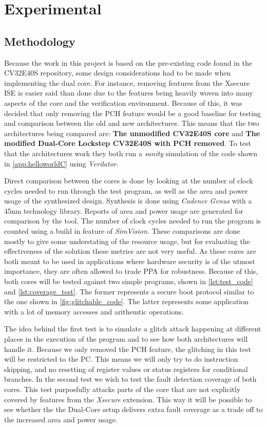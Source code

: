 \chapter{Experimental}
\label{chap4}

\section{Methodology}
\label{sec:method}

Because the work in this project is based on the pre-existing code found in the CV32E40S repository\cite{cv32e40s_manual}, some design considerations had to be made when implementing the dual core. For instance, removing features from the Xsecure ISE is easier said than done due to the features being heavily woven into many aspects of the core and the verification environment. Because of this, it was decided that only removing the PCH feature would be a good baseline for testing and comparison between the old and new architectures. This means that the two architectures being compared are: \textbf{The unmodified CV32E40S core} and \textbf{The modified Dual-Core Lockstep CV32E40S with PCH removed}. To test that the architectures work they both run a \textit{sanity} simulation of the code shown in \autoref{app:helloworldC} using \textit{Verilator}\cite{verilator}.

Direct comparison between the cores is done by looking at the number of clock cycles needed to run through the test program, as well as the area and power usage of the synthesized design. Synthesis is done using \textit{Cadence Genus} with a 45nm technology library. Reports of area and power usage are generated for comparison by the tool. The number of clock cycles needed to run the program is counted using a build in feature of \textit{SimVision}. These comparisons are done mostly to give some understating of the resource usage, but for evaluating the effectiveness of the solution these metrics are not very useful. As these cores are both meant to be used in applications where hardware security is of the utmost importance, they are often allowed to trade PPA for robustness. Because of this, both cores will be tested against two simple programs, shown in \autoref{lst:test_code} and \autoref{lst:coverage_test}. The former represents a secure boot protocol similar to the one shown in \autoref{fig:glitchable_code}. The latter represents some application with a lot of memory accesses and arithemtic operations. 

The idea behind the first test is to simulate a glitch attack happening at different places in the execution of the program and to see how both architectures will handle it. Because we only removed the PCH feature, the glitching in this test will be restricted to the PC. This means we will only try to do instruction skipping, and no resetting of register values or status registers for conditional branches. In the second test we wish to test the fault detection coverage of both cores. This test purposfully attacks parts of the core that are not explicitly covered by features from the \textit{Xsecure} extension. This way it will be possible to see whether the the Dual-Core setup delivers extra fault coverage as a trade off to the increased area and power usage. 

